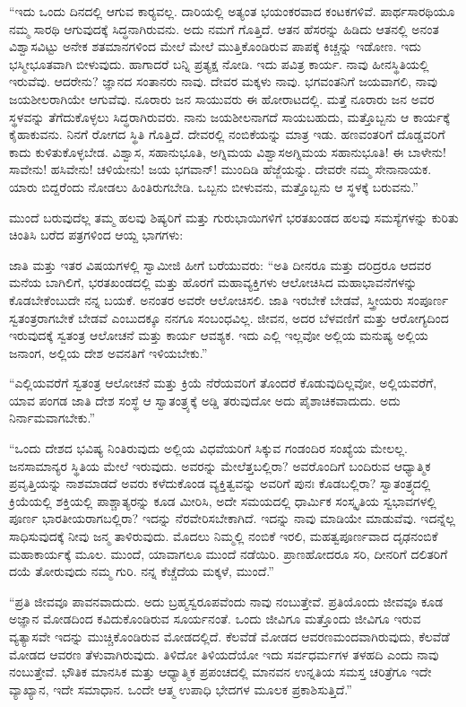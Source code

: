  “ಇದು ಒಂದು ದಿನದಲ್ಲಿ ಆಗುವ ಕಾರ‍್ಯವಲ್ಲ. ದಾರಿಯಲ್ಲಿ ಅತ್ಯಂತ ಭಯಂಕರವಾದ ಕಂಟಕಗಳಿವೆ. ಪಾರ್ಥಸಾರಥಿಯೂ ನಮ್ಮ ಸಾರಥಿ ಆಗುವುದಕ್ಕೆ ಸಿದ್ಧನಾಗಿರುವನು. ಅದು ನಮಗೆ ಗೊತ್ತಿದೆ. ಆತನ ಹೆಸರನ್ನು ಹಿಡಿದು ಆತನಲ್ಲಿ ಅನಂತ ವಿಶ್ವಾಸವಿಟ್ಟು ಅನೇಕ ಶತಮಾನಗಳಿಂದ ಮೇಲೆ ಮೇಲೆ ಮುತ್ತಿಕೊಂಡಿರುವ ಪಾಪಕ್ಕೆ ಕಿಚ್ಚನ್ನು ಇಡೋಣ. ಇದು ಭಸ್ಮೀಭೂತವಾಗಿ ಬೀಳುವುದು. ಹಾಗಾದರೆ ಬನ್ನಿ ಪ್ರತ್ಯಕ್ಷ ನೋಡಿ. ಇದು ಪವಿತ್ರ ಕಾರ್ಯ. ನಾವು ಹೀನಸ್ಥಿತಿಯಲ್ಲಿ ಇರುವೆವು. ಆದರೇನು? ಜ್ಞಾನದ ಸಂತಾನರು ನಾವು. ದೇವರ ಮಕ್ಕಳು ನಾವು. ಭಗವಂತನಿಗೆ ಜಯವಾಗಲಿ, ನಾವು ಜಯಶೀಲರಾಗಿಯೇ ಆಗುವೆವು. ನೂರಾರು ಜನ ಸಾಯುವರು ಈ ಹೋರಾಟದಲ್ಲಿ. ಮತ್ತೆ ನೂರಾರು ಜನ ಅವರ ಸ್ಥಳವನ್ನು ತೆಗೆದುಕೊಳ್ಳಲು ಸಿದ್ಧರಾಗಿರುವರು. ನಾನು ಜಯಶೀಲನಾಗದೆ ಸಾಯಬಹುದು, ಮತ್ತೊಬ್ಬನು ಆ ಕಾರ್ಯಕ್ಕೆ ಕೈಹಾಕುವನು. ನಿನಗೆ ರೋಗದ ಸ್ಥಿತಿ ಗೊತ್ತಿದೆ. ದೇವರಲ್ಲಿ ನಂಬಿಕೆಯನ್ನು ಮಾತ್ರ ಇಡು. ಹಣವಂತರಿಗೆ ದೊಡ್ಡವರಿಗೆ ಕಾದು ಕುಳಿತುಕೊಳ್ಳಬೇಡ. ವಿಶ್ವಾಸ, ಸಹಾನುಭೂತಿ, ಅಗ್ನಿಮಯ ವಿಶ್ವಾಸ\break ಅಗ್ನಿಮಯ ಸಹಾನುಭೂತಿ! ಈ ಬಾಳೇನು! ಸಾವೇನು! ಹಸಿವೇನು! ಚಳಿಯೇನು! ಜಯ ಭಗವಾನ್! ಮುಂದಿಡಿ ಹೆಜ್ಜೆಯನ್ನು. ದೇವರೇ ನಮ್ಮ ಸೇನಾನಾಯಕ. ಯಾರು ಬಿದ್ದರೆಂದು ನೋಡಲು ಹಿಂತಿರುಗಬೇಡಿ. ಒಬ್ಬನು ಬೀಳುವನು, ಮತ್ತೊಬ್ಬನು ಆ ಸ್ಥಳಕ್ಕೆ ಬರುವನು.” 

 ಮುಂದೆ ಬರುವುದೆಲ್ಲ ತಮ್ಮ ಹಲವು ಶಿಷ್ಯರಿಗೆ ಮತ್ತು ಗುರುಭಾಯಿಗಳಿಗೆ ಭರತಖಂಡದ ಹಲವು ಸಮಸ್ಯೆಗಳನ್ನು ಕುರಿತು ಚಿಂತಿಸಿ ಬರೆದ ಪತ್ರಗಳಿಂದ ಆಯ್ದ ಭಾಗಗಳು: 

 ಜಾತಿ ಮತ್ತು ಇತರ ವಿಷಯಗಳಲ್ಲಿ ಸ್ವಾಮೀಜಿ ಹೀಗೆ ಬರೆಯುವರು: “ಅತಿ ದೀನರೂ ಮತ್ತು ದರಿದ್ರರೂ ಆದವರ ಮನೆಯ ಬಾಗಿಲಿಗೆ, ಭರತಖಂಡದಲ್ಲಿ ಮತ್ತು ಹೊರಗೆ ಮಹಾವ್ಯಕ್ತಿಗಳು ಆಲೋಚಿಸಿದ ಮಹಾಭಾವನೆಗಳನ್ನು ಕೊಡಬೇಕೆಂಬುದೇ ನನ್ನ ಬಯಕೆ. ಅನಂತರ ಅವರೇ ಆಲೋಚಿಸಲಿ. ಜಾತಿ ಇರಬೇಕೆ ಬೇಡವೆ, ಸ್ತ್ರೀಯರು ಸಂಪೂರ್ಣ ಸ್ವತಂತ್ರರಾಗಬೇಕೆ ಬೇಡವೆ ಎಂಬುದಕ್ಕೂ ನನಗೂ ಸಂಬಂಧವಿಲ್ಲ. ಜೀವನ, ಅದರ ಬೆಳವಣಿಗೆ ಮತ್ತು ಆರೋಗ್ಯದಿಂದ ಇರುವುದಕ್ಕೆ ಸ್ವತಂತ್ರ ಆಲೋಚನೆ ಮತ್ತು ಕಾರ್ಯ ಆವಶ್ಯಕ. ಇದು ಎಲ್ಲಿ ಇಲ್ಲವೋ ಅಲ್ಲಿಯ ಮನುಷ್ಯ ಅಲ್ಲಿಯ ಜನಾಂಗ, ಅಲ್ಲಿಯ ದೇಶ ಅವನತಿಗೆ ಇಳಿಯಬೇಕು.” 

 “ಎಲ್ಲಿಯವರೆಗೆ ಸ್ವತಂತ್ರ ಆಲೋಚನೆ ಮತ್ತು ಕ್ರಿಯೆ ನೆರೆಯವರಿಗೆ ತೊಂದರೆ ಕೊಡುವುದಿಲ್ಲವೋ‌, ಅಲ್ಲಿಯವರೆಗೆ, ಯಾವ ಪಂಗಡ ಜಾತಿ ದೇಶ ಸಂಸ್ಥೆ ಆ ಸ್ವಾತಂತ್ರ್ಯಕ್ಕೆ ಅಡ್ಡಿ ತರುವುದೋ ಅದು ಪೈಶಾಚಿಕವಾದುದು. ಅದು ನಿರ್ನಾಮವಾಗಬೇಕು.” 

 “ಒಂದು ದೇಶದ ಭವಿಷ್ಯ ನಿಂತಿರುವುದು ಅಲ್ಲಿಯ ವಿಧವೆಯರಿಗೆ ಸಿಕ್ಕುವ ಗಂಡಂದಿರ ಸಂಖ್ಯೆಯ ಮೇಲಲ್ಲ. ಜನಸಾಮಾನ್ಯರ ಸ್ಥಿತಿಯ ಮೇಲೆ ಇರುವುದು. ಅವರನ್ನು ಮೇಲೆತ್ತಬಲ್ಲಿರಾ? ಅವರೊಂದಿಗೆ ಬಂದಿರುವ ಆಧ್ಯಾತ್ಮಿಕ ಪ್ರವೃತ್ತಿಯನ್ನು ನಾಶಮಾಡದೆ ಅವರು ಕಳೆದುಕೊಂಡ ವ್ಯಕ್ತಿತ್ವವನ್ನು ಅವರಿಗೆ ಪುನಃ ಕೊಡಬಲ್ಲಿರಾ? ಸ್ವಾತಂತ್ರ್ಯದಲ್ಲಿ ಕ್ರಿಯೆಯಲ್ಲಿ ಶಕ್ತಿಯಲ್ಲಿ ಪಾಶ್ಚಾತ್ಯರನ್ನು ಕೂಡ ಮೀರಿಸಿ, ಅದೇ ಸಮಯದಲ್ಲಿ ಧಾರ್ಮಿಕ ಸಂಸ್ಕೃತಿಯ ಸ್ವಭಾವಗಳಲ್ಲಿ ಪೂರ್ಣ ಭಾರತೀಯರಾಗಬಲ್ಲಿರಾ? ಇದನ್ನು ನೆರವೇರಿಸಬೇಕಾಗಿದೆ. ಇದನ್ನು ನಾವು ಮಾಡಿಯೇ ಮಾಡುವೆವು. ಇದನ್ನೆಲ್ಲ ಸಾಧಿಸುವುದಕ್ಕೆ ನೀವು ಜನ್ಮ ತಾಳಿರುವುದು. ಮೊದಲು ನಿಮ್ಮಲ್ಲಿ ನಂಬಿಕೆ ಇರಲಿ, ಮಹತ್ವಪೂರ್ಣವಾದ ದೃಢನಂಬಿಕೆ ಮಹಾಕಾರ್ಯಕ್ಕೆ ಮೂಲ. ಮುಂದೆ, ಯಾವಾಗಲೂ ಮುಂದೆ ನಡೆಯಿರಿ. ಪ್ರಾಣಹೋದರೂ ಸರಿ, ದೀನರಿಗೆ ದಲಿತರಿಗೆ ದಯೆ ತೋರುವುದು ನಮ್ಮ ಗುರಿ. ನನ್ನ ಕೆಚ್ಚೆದೆಯ ಮಕ್ಕಳೆ, ಮುಂದೆ.” 

 “ಪ್ರತಿ ಜೀವವೂ ಪಾವನವಾದುದು. ಅದು ಬ್ರಹ್ಮಸ್ವರೂಪವೆಂದು ನಾವು ನಂಬುತ್ತೇವೆ. ಪ್ರತಿಯೊಂದು ಜೀವವೂ ಕೂಡ ಅಜ್ಞಾನ ಮೋಡದಿಂದ ಕವಿದುಕೊಂಡಿರುವ ಸೂರ್ಯನಂತೆ. ಒಂದು ಜೀವಿಗೂ ಮತ್ತೊಂದು ಜೀವಿಗೂ ಇರುವ ವ್ಯತ್ಯಾಸವೇ ಇದನ್ನು ಮುಚ್ಚಿಕೊಂಡಿರುವ ಮೋಡದಲ್ಲಿದೆ. ಕೆಲವೆಡೆ ಮೋಡದ ಆವರಣ\break ಮಂದವಾಗಿರುವುದು, ಕೆಲವೆಡೆ ಮೋಡದ ಆವರಣ ತೆಳುವಾಗಿರುವುದು. ತಿಳಿದೋ ತಿಳಿಯದೆಯೋ ಇದು ಸರ್ವಧರ್ಮಗಳ ತಳಹದಿ ಎಂದು ನಾವು ನಂಬುತ್ತೇವೆ. ಭೌತಿಕ ಮಾನಸಿಕ ಮತ್ತು ಆಧ್ಯಾತ್ಮಿಕ ಪ್ರಪಂಚದಲ್ಲಿ ಮಾನವನ ಉನ್ನತಿಯ ಸಮಸ್ತ ಚರಿತ್ರೆಗೂ ಇದೇ ವ್ಯಾಖ್ಯಾನ, ಇದೇ ಸಮಾಧಾನ. ಒಂದೇ ಆತ್ಮ ಉಪಾಧಿ ಭೇದಗಳ ಮೂಲಕ ಪ್ರಕಾಶಿಸುತ್ತಿದೆ.” 

